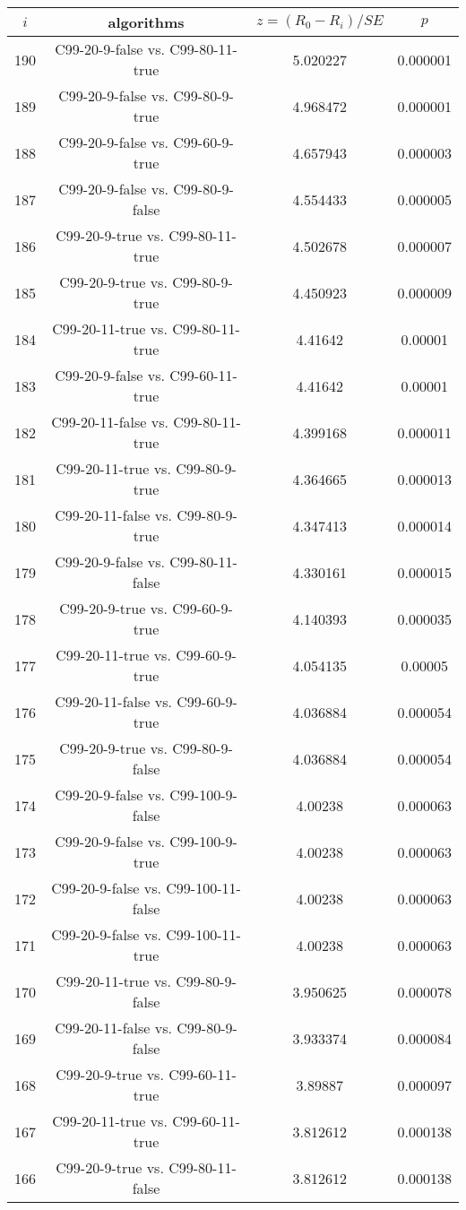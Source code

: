 \documentclass[a4paper,10pt]{article}
\begin{document}
\begin{landscape}
\begin{table}[!htp]
\centering\scriptsize
\begin{tabular}{cccc}
$i$&algorithms&$z=(R_0 - R_i)/SE$&$p$\\
\hline190&C99-20-9-false vs. C99-80-11-true&5.020227&0.000001\\
189&C99-20-9-false vs. C99-80-9-true&4.968472&0.000001\\
188&C99-20-9-false vs. C99-60-9-true&4.657943&0.000003\\
187&C99-20-9-false vs. C99-80-9-false&4.554433&0.000005\\
186&C99-20-9-true vs. C99-80-11-true&4.502678&0.000007\\
185&C99-20-9-true vs. C99-80-9-true&4.450923&0.000009\\
184&C99-20-11-true vs. C99-80-11-true&4.41642&0.00001\\
183&C99-20-9-false vs. C99-60-11-true&4.41642&0.00001\\
182&C99-20-11-false vs. C99-80-11-true&4.399168&0.000011\\
181&C99-20-11-true vs. C99-80-9-true&4.364665&0.000013\\
180&C99-20-11-false vs. C99-80-9-true&4.347413&0.000014\\
179&C99-20-9-false vs. C99-80-11-false&4.330161&0.000015\\
178&C99-20-9-true vs. C99-60-9-true&4.140393&0.000035\\
177&C99-20-11-true vs. C99-60-9-true&4.054135&0.00005\\
176&C99-20-11-false vs. C99-60-9-true&4.036884&0.000054\\
175&C99-20-9-true vs. C99-80-9-false&4.036884&0.000054\\
174&C99-20-9-false vs. C99-100-9-false&4.00238&0.000063\\
173&C99-20-9-false vs. C99-100-9-true&4.00238&0.000063\\
172&C99-20-9-false vs. C99-100-11-false&4.00238&0.000063\\
171&C99-20-9-false vs. C99-100-11-true&4.00238&0.000063\\
170&C99-20-11-true vs. C99-80-9-false&3.950625&0.000078\\
169&C99-20-11-false vs. C99-80-9-false&3.933374&0.000084\\
168&C99-20-9-true vs. C99-60-11-true&3.89887&0.000097\\
167&C99-20-11-true vs. C99-60-11-true&3.812612&0.000138\\
166&C99-20-9-true vs. C99-80-11-false&3.812612&0.000138\\

\end{tabular}
\end{table}
\end{landscape}
\end{document}
